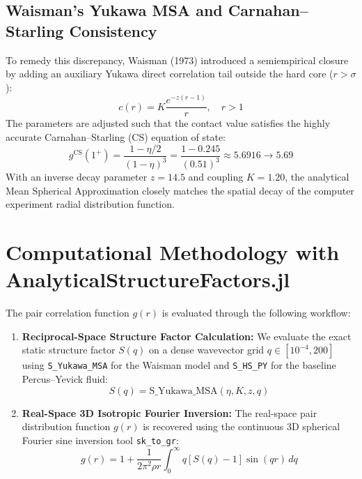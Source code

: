 \documentclass[11pt,a4paper]{article}
\begin{document}
\subsection{Waisman's Yukawa MSA and Carnahan--Starling Consistency}
To remedy this discrepancy, Waisman (1973) introduced a semiempirical closure by adding an auxiliary Yukawa direct correlation tail outside the hard core ($r > \sigma$):
\begin{equation}
    c(r) = K \frac{e^{-z (r - 1)}}{r}, \quad r > 1
\end{equation}
The parameters are adjusted such that the contact value satisfies the highly accurate Carnahan--Starling (CS) equation of state:
\begin{equation}
    g^{\text{CS}}(1^+) = \frac{1 - \eta/2}{(1 - \eta)^3} = \frac{1 - 0.245}{(0.51)^3} \approx 5.6916 \to 5.69
\end{equation}
With an inverse decay parameter $z = 14.5$ and coupling $K = 1.20$, the analytical Mean Spherical Approximation closely matches the spatial decay of the computer experiment radial distribution function.

\section{Computational Methodology with \textsf{AnalyticalStructureFactors.jl}}

The pair correlation function $g(r)$ is evaluated through the following workflow:
\begin{enumerate}
    \item \textbf{Reciprocal-Space Structure Factor Calculation:}
    We evaluate the exact static structure factor $S(q)$ on a dense wavevector grid $q \in [10^{-4}, 200]$ using \texttt{S\_Yukawa\_MSA} for the Waisman model and \texttt{S\_HS\_PY} for the baseline Percus--Yevick fluid:
    \begin{equation}
        S(q) = \text{S\_Yukawa\_MSA}(\eta, K, z, q)
    \end{equation}
    \item \textbf{Real-Space 3D Isotropic Fourier Inversion:}
    The real-space pair distribution function $g(r)$ is recovered using the continuous 3D spherical Fourier sine inversion tool \texttt{sk\_to\_gr}:
    \begin{equation}
        g(r) = 1 + \frac{1}{2\pi^2 \rho r} \int_0^\infty q \left[ S(q) - 1 \right] \sin(q r) \, dq
    \end{equation}
\end{enumerate}
\end{document}
